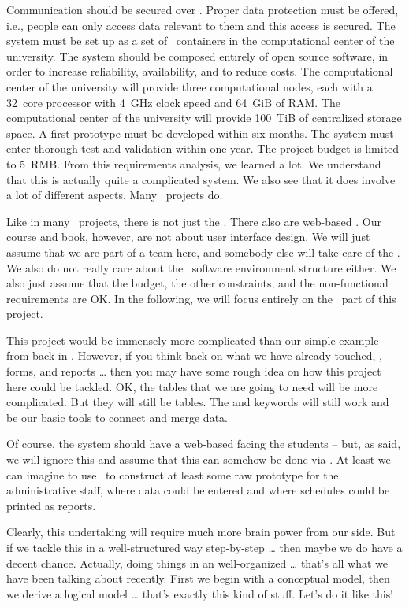 Communication should be secured over .
Proper data protection must be offered, i.e., people can only access data relevant to them and this access is secured.%
\endhsection%
%
%
The system must be set up as a set of \docker\ containers in the computational center of the university.
The system should be composed entirely of open source software, in order to increase reliability, availability, and to reduce costs.
The computational center of the university will provide three computational nodes, each with a 32~core processor with 4~GHz clock speed and 64~GiB of RAM.
The computational center of the university will provide 100~TiB of centralized storage space.
A first prototype must be developed within six months.
The system must enter thorough test and validation within one year.
The project budget is limited to 5~RMB.%
\endhsection%
%
%
From this requirements analysis, we learned a lot.
We understand that this is actually quite a complicated system.
We also see that it does involve a lot of different aspects.
Many \db\ projects do.

Like in many \db\ projects, there is not just the \db.
There also are web-based .
Our course and book, however, are not about user interface design.
We will just assume that we are part of a team here, and somebody else will take care of the .
We also do not really care about the \docker\ software environment structure either.
We also just assume that the budget, the other constraints, and the non-functional requirements are OK.
In the following, we will focus entirely on the \db\ part of this project.

This project would be immensely more complicated than our simple example from back in .
However, if you think back on what we have already touched, \sql, forms, and reports {\dots} then you may have some rough idea on how this project here could be tackled.
OK, the tables that we are going to need will be more complicated.
But they will still be tables.
The  and  keywords will still work and be our basic tools to connect and merge data.

Of course, the system should have a web-based  facing the students -- but, as said, we will ignore this and assume that this can somehow be done via \python.
At least we can imagine to use \libreofficeBase\ to construct at least some raw prototype for the administrative staff, where data could be entered and where schedules could be printed as reports.

Clearly, this undertaking will require much more brain power from our side.
But if we tackle this in a well-structured way step-by-step {\dots} then maybe we do have a decent chance.
Actually, doing things in an well-organized {\dots} that's all what we have been talking about recently.
First we begin with a conceptual model, then we derive a logical model {\dots} that's exactly this kind of stuff.
Let's do it like this!%
\endhsection%
%
\endhsection%
\endhsection%
%

